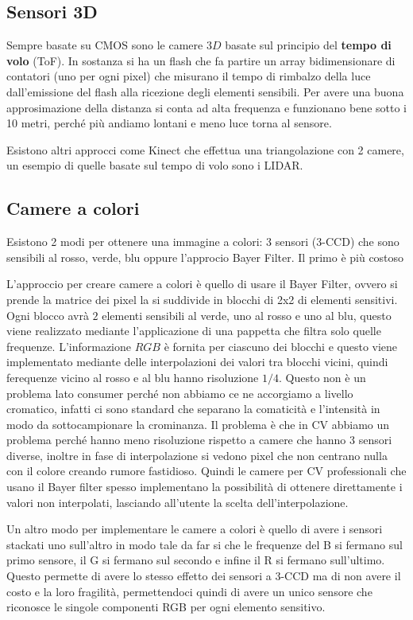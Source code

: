 \subsection{Sensori 3D}
Sempre basate su CMOS sono le camere $3D$ basate sul principio del \textbf{tempo di volo} (ToF). 
In sostanza si ha un flash che fa partire 
un array bidimensionare di contatori (uno per ogni pixel) che misurano il tempo 
di rimbalzo della luce dall'emissione del flash alla ricezione degli elementi 
sensibili. Per avere una buona approsimazione della distanza si conta ad alta frequenza
e funzionano bene sotto i 10 metri, perché più andiamo lontani e meno luce torna 
al sensore.

Esistono altri approcci come Kinect che effettua una triangolazione con 2 camere,
un esempio di quelle basate sul tempo di volo sono i LIDAR.

\subsection{Camere a colori}
Esistono 2 modi per ottenere una immagine a colori: 3 sensori (3-CCD) che sono sensibili 
al rosso, verde, blu oppure l'approcio Bayer Filter. Il primo è più costoso

L'approccio per creare camere a colori è quello di usare il Bayer Filter, ovvero 
si prende la matrice dei pixel la si suddivide in blocchi di 2x2 di elementi sensitivi.
Ogni blocco avrà $2$ elementi sensibili al verde, uno al rosso e uno al blu, questo 
viene realizzato mediante l'applicazione di una pappetta che filtra solo quelle frequenze.
L'informazione $RGB$ è fornita per ciascuno dei blocchi e questo viene implementato 
mediante delle interpolazioni dei valori tra blocchi vicini, quindi ferequenze vicino 
al rosso e al blu hanno risoluzione $1/4$. Questo non è un problema lato consumer
perché non abbiamo ce ne accorgiamo a livello cromatico, infatti ci sono standard
che separano la comaticità e l'intensità in modo da sottocampionare la crominanza.
Il problema è che in CV abbiamo un problema perché hanno meno risoluzione rispetto 
a camere che hanno 3 sensori diverse, inoltre in fase di interpolazione si vedono 
pixel che non centrano nulla con il colore creando rumore fastidioso. Quindi le camere per CV professionali 
che usano il Bayer filter spesso implementano la possibilità di ottenere direttamente 
i valori non interpolati, lasciando all'utente la scelta dell'interpolazione. 

Un altro modo per implementare le camere a colori è quello di avere i sensori stackati 
uno sull'altro in modo tale da far si che le frequenze del B si fermano sul primo 
sensore, il G si fermano sul secondo e infine il R si fermano sull'ultimo. Questo 
permette di avere lo stesso effetto dei sensori a 3-CCD ma di non avere il costo 
e la loro fragilità, permettendoci quindi di avere un unico sensore che riconosce
le singole componenti RGB per ogni elemento sensitivo.
